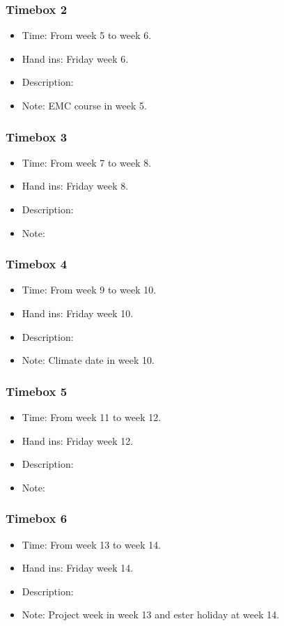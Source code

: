 \documentclass[10pt,a4paper]{article}
\begin{document}
\subsubsection{Timebox 2}
\begin{itemize}
\item Time: From week 5 to week 6.
\item Hand ins: Friday week 6.
\item Description:
\item Note: EMC course in week 5.
\end{itemize}

\subsubsection{Timebox 3}
\begin{itemize}
\item Time: From week 7 to week 8.
\item Hand ins: Friday week 8.
\item Description:
\item Note:
\end{itemize}

\subsubsection{Timebox 4}
\begin{itemize}
\item Time: From week 9 to week 10.
\item Hand ins: Friday week 10.
\item Description:
\item Note: Climate date in week 10.
\end{itemize}

\subsubsection{Timebox 5}
\begin{itemize}
\item Time: From week 11 to week 12.
\item Hand ins: Friday week 12.
\item Description:
\item Note:
\end{itemize}

\subsubsection{Timebox 6}
\begin{itemize}
\item Time: From week 13 to week 14.
\item Hand ins: Friday week 14.
\item Description:
\item Note: Project week in week 13 and ester holiday at week 14.
\end{itemize}
\end{document}
